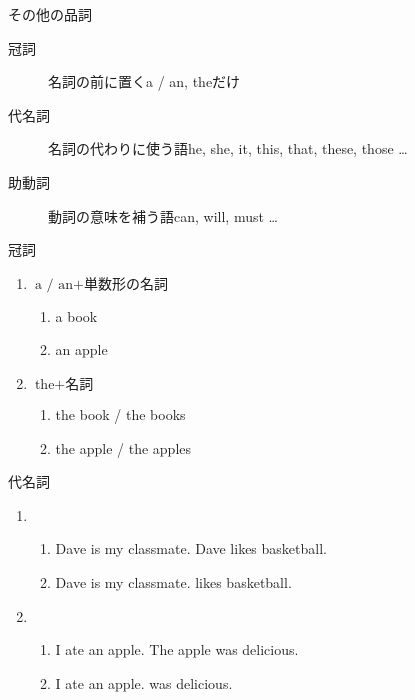 \documentclass[aspectratio=169,xcolor={dvipsnames,table}]{beamer}
\begin{document}
\begin{frame}[plain]{その他の品詞}
 \begin{description}
  \item[冠詞]  名詞の前に置く\hfill{}a / an, theだけ
  \item[代名詞] 名詞の代わりに使う語\hfill{}he, she, it, this, that, these, those \dots
  \item[助動詞] 動詞の意味を補う語\hfill{}can, will, must \ldots 
 \end{description}
\end{frame}
\begin{frame}[plain]{冠詞}
\Large
 \begin{enumerate}
  \item $\text{a / an} + \text{単数形の名詞}$
	\begin{enumerate}
	 \item a book\hfill\textipa{/\textschwa /}
	 \item an apple\hfill{}
	\end{enumerate}
  \item $\text{the} + \text{名詞}$\hspace{10pt}{\small (単数形・複数形どちらもあり)}
	\begin{enumerate}
	 \item the book / the books\hfill\textipa{/\dh\textschwa/}
	 \item the apple / the apples\hfill{}
	\end{enumerate}
 \end{enumerate}
\end{frame}
\begin{frame}[plain]{代名詞}
\Large
 \begin{enumerate} 
  \item \begin{enumerate}
	 \item<1-> Dave is my classmate. Dave likes basketball.
	 \item<2-> Dave is my classmate.  likes basketball.
	\end{enumerate}  \item \begin{enumerate}
	 \item<3-> I ate an apple. The apple was delicious.
	 \item<4-> I ate an apple.  was delicious.
	\end{enumerate}
 \end{enumerate}
\end{frame}
\end{document}
